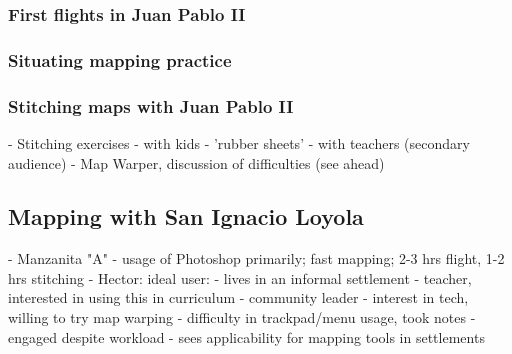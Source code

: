 \documentclass[11pt]{report}
\begin{document}
\subsubsection{First flights in Juan Pablo II}


\subsubsection{Situating mapping practice}


\subsubsection{Stitching maps with Juan Pablo II}
                - Stitching exercises
                    - with kids - 'rubber sheets'
                        - with teachers (secondary audience) - Map Warper, discussion of difficulties (see ahead)

\subsection{Mapping with San Ignacio Loyola}
            - Manzanita "A"
            - usage of Photoshop primarily; fast mapping; 2-3 hrs flight, 1-2 hrs stitching
            - Hector: ideal user: 
                - lives in an informal settlement
                - teacher, interested in using this in curriculum
                - community leader
                - interest in tech, willing to try map warping
                    - difficulty in trackpad/menu usage, took notes
                - engaged despite workload
                - sees applicability for mapping tools in settlements
\end{document}

